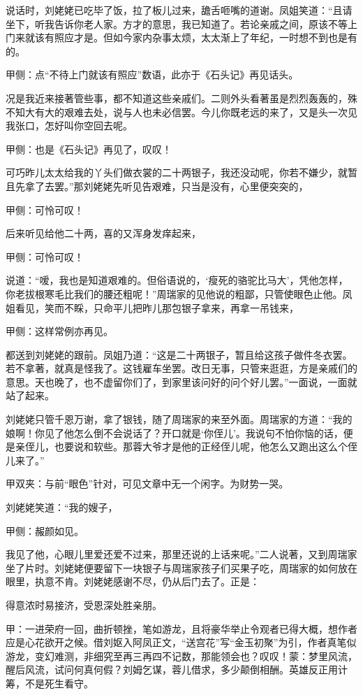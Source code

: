\begin{parag}
    说话时，刘姥姥已吃毕了饭，拉了板儿过来，舚舌咂嘴的道谢。凤姐笑道：“且请坐下，听我告诉你老人家。方才的意思，我已知道了。若论亲戚之间，原该不等上门来就该有照应才是。但如今家内杂事太烦，太太渐上了年纪，一时想不到也是有的。\begin{note}甲侧：点“不待上门就该有照应”数语，此亦于《石头记》再见话头。\end{note}况是我近来接著管些事，都不知道这些亲戚们。二则外头看著虽是烈烈轰轰的，殊不知大有大的艰难去处，说与人也未必信罢。今儿你既老远的来了，又是头一次见我张口，怎好叫你空回去呢。\begin{note}甲侧：也是《石头记》再见了，叹叹！\end{note}可巧昨儿太太给我的丫头们做衣裳的二十两银子，我还没动呢，你若不嫌少，就暂且先拿了去罢。”那刘姥姥先听见告艰难，只当是没有，心里便突突的，\begin{note}甲侧：可怜可叹！\end{note}后来听见给他二十两，喜的又浑身发痒起来，\begin{note}甲侧：可怜可叹！\end{note}说道：“嗳，我也是知道艰难的。但俗语说的，‘瘦死的骆驼比马大’，凭他怎样，你老拔根寒毛比我们的腰还粗呢！”周瑞家的见他说的粗鄙，只管使眼色止他。凤姐看见，笑而不睬，只命平儿把昨儿那包银子拿来，再拿一吊钱来，\begin{note}甲侧：这样常例亦再见。\end{note}都送到刘姥姥的跟前。凤姐乃道：“这是二十两银子，暂且给这孩子做件冬衣罢。若不拿著，就真是怪我了。这钱雇车坐罢。改日无事，只管来逛逛，方是亲戚们的意思。天也晚了，也不虚留你们了，到家里该问好的问个好儿罢。”一面说，一面就站了起来。
\end{parag}


\begin{parag}
    刘姥姥只管千恩万谢，拿了银钱，随了周瑞家的来至外面。周瑞家的方道：“我的娘啊！你见了他怎么倒不会说话了？开口就是‘你侄儿’。我说句不怕你恼的话，便是亲侄儿，也要说和软些。那蓉大爷才是他的正经侄儿呢，他怎么又跑出这么个侄儿来了。”\begin{note}甲双夹：与前“眼色”针对，可见文章中无一个闲字。为财势一哭。\end{note}刘姥姥笑道：“我的嫂子，\begin{note}甲侧：赧颜如见。\end{note}我见了他，心眼儿里爱还爱不过来，那里还说的上话来呢。”二人说著，又到周瑞家坐了片时。刘姥姥便要留下一块银子与周瑞家孩子们买果子吃，周瑞家的如何放在眼里，执意不肯。刘姥姥感谢不尽，仍从后门去了。正是：
\end{parag}


\begin{poem}
    \begin{pl}得意浓时易接济，受恩深处胜亲朋。\end{pl}
\end{poem}


\begin{parag}
    \begin{note}甲：一进荣府一回，曲折顿挫，笔如游龙，且将豪华举止令观者已得大概，想作者应是心花欲开之候。借刘妪入阿凤正文，“送宫花”写“金玉初聚”为引，作者真笔似游龙，变幻难测，非细究至再三再四不记数，那能领会也？叹叹！蒙：梦里风流，醒后风流，试问何真何假？刘姆乞谋，蓉儿借求，多少颠倒相酬。英雄反正用计筹，不是死生看守。\end{note}
\end{parag}
